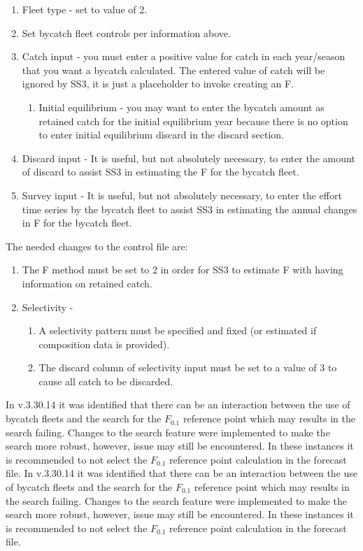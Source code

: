 \begin{enumerate}
	\item Fleet type - set to value of 2.
	\item Set bycatch fleet controls per information above.
	\item Catch input - you must enter a positive value for catch in each year/season that you want a bycatch calculated.  The entered value of catch will be ignored by SS3, it is just a placeholder to invoke creating an F.
	\begin{enumerate}
		\item Initial equilibrium - you may want to enter the bycatch amount as retained catch for the initial equilibrium year because there is no option to enter initial equilibrium discard in the discard section.
	\end{enumerate}	
	\item Discard input - It is useful, but not absolutely necessary, to enter the amount of discard to assist SS3 in estimating the F for the bycatch fleet.
	\item Survey input - It is useful, but not absolutely necessary, to enter the effort time series by the bycatch fleet to assist SS3 in estimating the annual changes in F for the bycatch fleet.
\end{enumerate}

The needed changes to the control file are:

\begin{enumerate}
	\item The F method must be set to 2 in order for SS3 to estimate F with having information on retained catch.
	\item Selectivity - 
	\begin{enumerate}
		\item A selectivity pattern must be specified and fixed (or estimated if composition data is provided).
		\item The discard column of selectivity input must be set to a value of 3 to cause all catch to be discarded.
	\end{enumerate}	
\end{enumerate}

In v.3.30.14 it was identified that there can be an interaction between the use of bycatch fleets and the search for the $F_{0.1}$ reference point which may results in the search failing.  Changes to the search feature were implemented to make the search more robust, however, issue may still be encountered. In these instances it is recommended to not select the $F_{0.1}$ reference point calculation in the forecast file.
In v.3.30.14 it was identified that there can be an interaction between the use of bycatch fleets and the search for the $F_{0.1}$ reference point which may results in the search failing.  Changes to the search feature were implemented to make the search more robust, however, issue may still be encountered. In these instances it is recommended to not select the $F_{0.1}$ reference point calculation in the forecast file.

